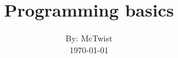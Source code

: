 

\def\writer{McTwist}

\title{Programming basics}
\author{By: \writer\\
	\today}



\maketitle

\newpage
\tableofcontents

\newpage
{}





%


